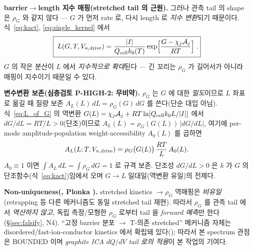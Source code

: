 \textbf{barrier$\to$length 지수 매핑(stretched tail 의 근원).} 그러나 관측 tail 의 shape 은 $\rho_G$ 와
같지 않다 — $G$ 가 먼저 rate 로, 다시 length 로 \emph{지수 변환}되기 때문이다. 식~\eqref{eq:kact},
\eqref{eq:single_kernel} 에서
\begin{equation}
\boxed{\;L(G,T,V_{n,\mathrm{drive}})=\frac{|I|}{Q_{\mathrm{cell}} k_0(T)}\exp\!\Big[\frac{G-\chi_j\mathcal A_j}{RT}\Big]\;.}
\label{eq:L_of_G}
\end{equation}
$G$ 의 작은 분산이 $L$ 에서 \emph{지수적으로 확대}된다 — 긴 꼬리는 $\rho_G$ 가 길어서가 아니라 매핑이
지수이기 때문일 수 있다.

\textbf{변수변환 보존(심층검토 P-HIGH-2: 무비약).} $\rho_G$ 는 $G$ 에 대한 \emph{밀도}이므로 $L$ 좌표로
옮길 때 질량 보존 $A_L(L)\,dL=\rho_G(G)\,dG$ 를 쓴다(단순 대입 아님). 식~\eqref{eq:L_of_G} 의 역변환
$G(L)=\chi_j\mathcal A_j+RT\ln[Q_{\mathrm{cell}} k_0 L/|I|]$ 에서 $dG/dL=RT/L>0$(단조)이므로
$A_L(L)=\rho_G(G(L))\,|dG/dL|$, 여기에 per-mode amplitude$\cdot$population weight$\cdot$accessibility
$A_0(L)$ 를 곱하면
\begin{equation}
A_L(L;T,V_{n,\mathrm{drive}})=\rho_G\big(G(L)\big)\,\frac{RT}{L}\,A_0(L).
\label{eq:spectrum}
\end{equation}
$A_0\equiv1$ 이면 $\int A_L\,dL=\int\rho_G\,dG=1$ 로 규격 보존. 단조성 $dG/dL>0$ 은 $k$ 가 $G$ 의
단조함수(식~\eqref{eq:kact})임에서 오며 $G\!\to\!L$ 일대일(역변환 유일)의 전제다.
\begin{boundbox}
\textbf{Non-uniqueness(, Plonka \cite{plonka2001}).} stretched kinetics $\to\rho_G$ 역매핑은
\emph{비유일}(retrapping 등 다른 메커니즘도 동일 stretched tail 재현). 따라서 $\rho_G$ 를 관측 tail 에서
\emph{역산하지 않고}, 독립 측정/모형한 $\rho_G$ 로부터 tail 을 \emph{forward 예측}만 한다(\S\ref{sec:falsify}, N4).
``고정 barrier 분포 $\to$ T-의존 stretched'' 메커니즘 자체는 disordered/fast-ion-conductor kinetics 에서
확립돼 있다(\cite{macdonald2000,lindsey1980}); 따라서 본 spectrum 관점은 BOUNDED 이며 \emph{graphite ICA
$dQ/dV$ tail 로의 적용}이 본 작업의 기여다.
\end{boundbox}

